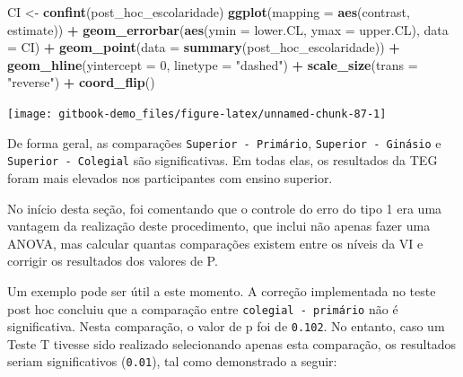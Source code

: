 \documentclass[
]{book}
\newenvironment{Shaded}{\begin{snugshade}}{\end{snugshade}}
\newcommand{\DataTypeTok}[1]{\textcolor[rgb]{0.13,0.29,0.53}{#1}}
\newcommand{\DecValTok}[1]{\textcolor[rgb]{0.00,0.00,0.81}{#1}}
\newcommand{\KeywordTok}[1]{\textcolor[rgb]{0.13,0.29,0.53}{\textbf{#1}}}
\newcommand{\NormalTok}[1]{#1}
\newcommand{\OperatorTok}[1]{\textcolor[rgb]{0.81,0.36,0.00}{\textbf{#1}}}
\newcommand{\StringTok}[1]{\textcolor[rgb]{0.31,0.60,0.02}{#1}}
\begin{document}
\begin{Shaded}
\begin{Highlighting}[]
\NormalTok{CI <-}\StringTok{ }\KeywordTok{confint}\NormalTok{(post_hoc_escolaridade)}
\KeywordTok{ggplot}\NormalTok{(}\DataTypeTok{mapping =} \KeywordTok{aes}\NormalTok{(contrast, estimate)) }\OperatorTok{+}
\StringTok{  }\KeywordTok{geom_errorbar}\NormalTok{(}\KeywordTok{aes}\NormalTok{(}\DataTypeTok{ymin =}\NormalTok{ lower.CL, }\DataTypeTok{ymax =}\NormalTok{ upper.CL), }\DataTypeTok{data =}\NormalTok{ CI) }\OperatorTok{+}
\StringTok{  }\KeywordTok{geom_point}\NormalTok{(}\DataTypeTok{data =} \KeywordTok{summary}\NormalTok{(post_hoc_escolaridade)) }\OperatorTok{+}
\StringTok{  }\KeywordTok{geom_hline}\NormalTok{(}\DataTypeTok{yintercept =} \DecValTok{0}\NormalTok{, }\DataTypeTok{linetype =} \StringTok{"dashed"}\NormalTok{) }\OperatorTok{+}\StringTok{ }
\StringTok{  }\KeywordTok{scale_size}\NormalTok{(}\DataTypeTok{trans =} \StringTok{"reverse"}\NormalTok{) }\OperatorTok{+}\StringTok{ }
\StringTok{  }\KeywordTok{coord_flip}\NormalTok{()}
\end{Highlighting}
\end{Shaded}

\begin{center}\texttt{[image: gitbook-demo\_files/figure-latex/unnamed-chunk-87-1]} \end{center}

De forma geral, as comparações \texttt{Superior\ -\ Primário}, \texttt{Superior\ -\ Ginásio} e \texttt{Superior\ -\ Colegial} são significativas. Em todas elas, os resultados da TEG foram mais elevados nos participantes com ensino superior.

No início desta seção, foi comentando que o controle do erro do tipo 1 era uma vantagem da realização deste procedimento, que inclui não apenas fazer uma ANOVA, mas calcular quantas comparações existem entre os níveis da VI e corrigir os resultados dos valores de P.

Um exemplo pode ser útil a este momento. A correção implementada no teste post hoc concluiu que a comparação entre \texttt{colegial\ -\ primário} não é significativa. Nesta comparação, o valor de p foi de \texttt{0.102}. No entanto, caso um Teste T tivesse sido realizado selecionando apenas esta comparação, os resultados seriam significativos (\texttt{0.01}), tal como demonstrado a seguir:

\begin{Shaded}
\end{Shaded}
\end{document}
